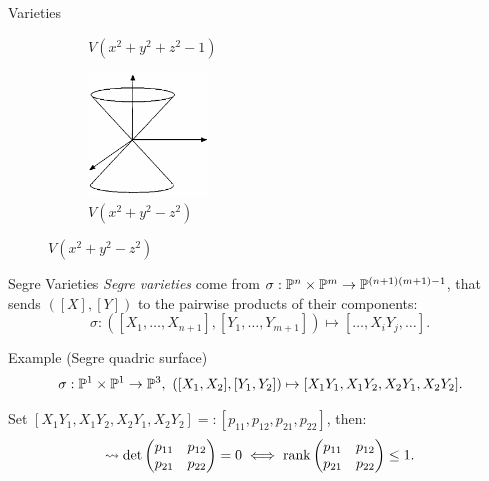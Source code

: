 \begin{frame}{Varieties}
\begin{figure}
\begin{subfigure}[b]{0.475\textwidth}
            \caption[]%
            {{\small $V(x^{2} + y^{2} + z^{2} - 1)$}}    
        \end{subfigure}
        \hfill
        \begin{subfigure}[b]{0.475\textwidth}   
            \centering 
            \includegraphics[width=0.35\textwidth]{resources/cone}
            \caption[]%
            {{\small $V(x^{2} + y^{2} - z^{2})$}}    
        \end{subfigure}
    \end{figure}

\end{frame}

\begin{frame}{Segre Varieties}
        \emph{Segre varieties} come from $\sigma: \mathbb{P}^{n} \times \mathbb{P}^{m} \rightarrow \mathbb{P}^{(n+1)(m+1) - 1}$, that sends $([X],[Y])$ to the pairwise products of their components:
            $$ \sigma : ([X_{1}, \ldots, X_{n+1}], [Y_{1}, \ldots, Y_{m+1}]) \mapsto [\ldots, X_{i}Y_{j}, \ldots ]. $$

        \begin{block}{Example (Segre quadric surface)}
        \vspace{-24pt}
        $$\sigma : \PP^{1} \times \PP^{1} \ra \PP^{3},\ ([X_{1}, X_{2}], [Y_{1}, Y_{2}]) \mapsto [ X_{1}Y_{1}, X_{1}Y_{2}, X_{2}Y_{1}, X_{2}Y_{2} ]. $$
        
        Set $[ X_{1}Y_{1}, X_{1}Y_{2}, X_{2}Y_{1}, X_{2}Y_{2} ] =: [p_{11}, p_{12}, p_{21}, p_{22}]$, then:
        $$ \rightsquigarrow \det \begin{pmatrix} p_{11} & p_{12} \\ p_{21} & p_{22} \end{pmatrix} = 0 \iff \rank \begin{pmatrix} p_{11} & p_{12} \\ p_{21} & p_{22} \end{pmatrix} \leq 1. $$
        \end{block}
\end{frame}

